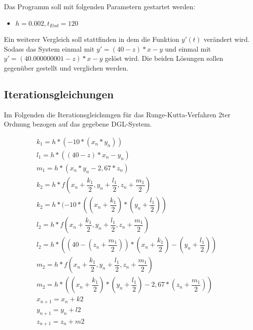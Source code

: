 \documentclass[]{scrartcl}
\begin{document}
Das Programm soll mit folgenden Parametern gestartet werden:
\begin{itemize}
	\item $h = 0.002,  t_{End} = 120 $
\end{itemize}

Ein weiterer Vergleich soll stattfinden in dem die Funktion $y'(t)$ verändert wird. Sodass das System einmal mit $y' = (40 - z) * x - y$ und einmal mit $y' = (40.000000001 - z) * x - y$ gelöst wird. Die beiden Lösungen sollen gegenüber gestellt und verglichen werden.


\subsection{Iterationsgleichungen}
Im Folgenden die Iterationsgleichungen für das Runge-Kutta-Verfahren 2ter Ordnung bezogen auf das gegebene DGL-System.

\begin{align}
k_{1} = h * (-10 * (x_{n} * y_{n})) \\
l_{1} = h * ((40 - z) * x_{n} - y_{n}) \\
m_{1} = h * (x_{n} * y_{n} - 2,67 * z_{n}) \\
k_{2} = h*f(x_{n} + \dfrac{k_{1} }{2},y_{n} + \dfrac{l_{1} }{2},z_{n} + \dfrac{m_{1} }{2}) \\
k_{2} = h* (-10 * ((x_{n} + \dfrac{k_{1} }{2})*(y_{n} + \dfrac{l_{1} }{2})) \\
l_{2} = h*f(x_{n} + \dfrac{k_{1} }{2},y_{n} + \dfrac{l_{1} }{2},z_{n} + \dfrac{m_{1} }{2}) \\
l_{2} = h*((40 - (z_{n} + \dfrac{m_{1} }{2})) * (x_{n} + \dfrac{k_{1} }{2}) - (y_{n} + \dfrac{l_{1} }{2})) \\
m_{2} = h*f(x_{n} + \dfrac{k_{1} }{2},y_{n} + \dfrac{l_{1} }{2},z_{n} + \dfrac{m_{1} }{2}) \\
m_{2} = h*((x_{n} + \dfrac{k_{1} }{2}) * (y_{n} + \dfrac{l_{1} }{2}) - 2,67 * (z_{n} + \dfrac{m_{1} }{2})) \\
x_{n+1} = x_{n} + k2 \\
y_{n+1} = y_{n} + l2 \\
z_{n+1} = z_{n} + m2
\end{align}
\end{document}
